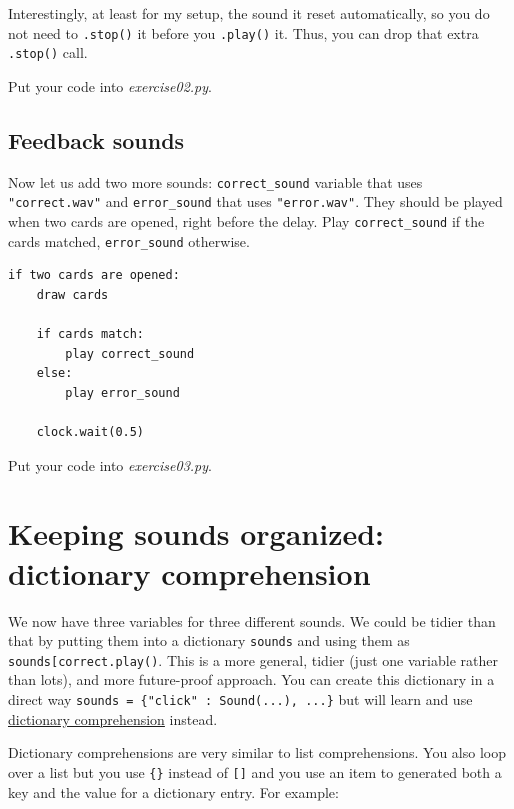 \documentclass[
]{book}
\begin{document}
Interestingly, at least for my setup, the sound it reset automatically, so you do not need to \texttt{.stop()} it before you \texttt{.play()} it. Thus, you can drop that extra \texttt{.stop()} call.

Put your code into \emph{exercise02.py}.

\hypertarget{feedback-sounds}{%
\section{Feedback sounds}\label{feedback-sounds}}

Now let us add two more sounds: \texttt{correct\_sound} variable that uses \texttt{"correct.wav"} and \texttt{error\_sound} that uses \texttt{"error.wav"}. They should be played when two cards are opened, right before the delay. Play \texttt{correct\_sound} if the cards matched, \texttt{error\_sound} otherwise.

\begin{verbatim}
if two cards are opened:
    draw cards
    
    if cards match:
        play correct_sound
    else:
        play error_sound
        
    clock.wait(0.5)
\end{verbatim}

Put your code into \emph{exercise03.py}.

\hypertarget{keeping-sounds-organized-dictionary-comprehension}{%
\chapter{Keeping sounds organized: dictionary comprehension}\label{keeping-sounds-organized-dictionary-comprehension}}

We now have three variables for three different sounds. We could be tidier than that by putting them into a dictionary \texttt{sounds} and using them as \texttt{sounds{[}\textquotesingle{}correct\textquotesingle{}{]}.play()}. This is a more general, tidier (just one variable rather than lots), and more future-proof approach. You can create this dictionary in a direct way \texttt{sounds\ =\ \{"click"\ :\ Sound(...),\ ...\}} but will learn and use \href{https://www.python.org/dev/peps/pep-0274/}{dictionary comprehension} instead.

Dictionary comprehensions are very similar to list comprehensions. You also loop over a list but you use \texttt{\{\}} instead of \texttt{{[}{]}} and you use an item to generated both a key and the value for a dictionary entry. For example:
\end{document}
